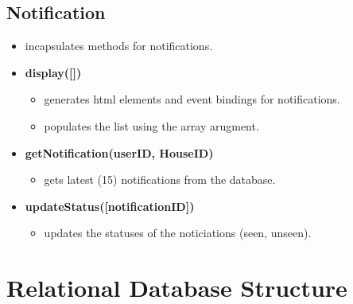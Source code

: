 \documentclass[12pt]{article}
\begin{document}
\subsection{Notification}
\begin{itemize}
  \item incapsulates methods for notifications.
  \item \textbf{display([])}
    \begin{itemize}
    \item generates html elements and event bindings for notifications.
    \item populates the list using the array arugment.
    \end{itemize}
  \item \textbf{getNotification(userID, HouseID)}
    \begin{itemize}
    \item gets latest (15) notifications from the database.
    \end{itemize}
  \item \textbf{updateStatus([notificationID])}
    \begin{itemize}
    \item updates the statuses of the noticiations (seen, unseen).
    \end{itemize}
\end{itemize}



\section{Relational Database Structure}
\end{document}
